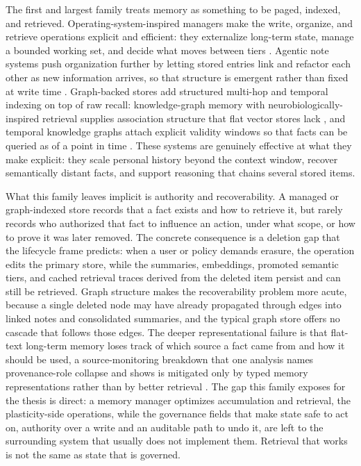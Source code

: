 The first and largest family treats memory as something to be paged, indexed, and retrieved. Operating-system-inspired managers make the write, organize, and retrieve operations explicit and efficient: they externalize long-term state, manage a bounded working set, and decide what moves between tiers \citep{packer2024memgptllmsoperatingsystems,kang2025memoryosaiagent}. Agentic note systems push organization further by letting stored entries link and refactor each other as new information arrives, so that structure is emergent rather than fixed at write time \citep{xu2025amemagenticmemoryllm}. Graph-backed stores add structured multi-hop and temporal indexing on top of raw recall: knowledge-graph memory with neurobiologically-inspired retrieval supplies association structure that flat vector stores lack \citep{gutierrez2024hipporag}, and temporal knowledge graphs attach explicit validity windows so that facts can be queried as of a point in time \citep{rasmussen2025zep}. These systems are genuinely effective at what they make explicit: they scale personal history beyond the context window, recover semantically distant facts, and support reasoning that chains several stored items.

What this family leaves implicit is authority and recoverability. A managed or graph-indexed store records that a fact exists and how to retrieve it, but rarely records who authorized that fact to influence an action, under what scope, or how to prove it was later removed. The concrete consequence is a deletion gap that the lifecycle frame predicts: when a user or policy demands erasure, the operation edits the primary store, while the summaries, embeddings, promoted semantic tiers, and cached retrieval traces derived from the deleted item persist and can still be retrieved. Graph structure makes the recoverability problem more acute, because a single deleted node may have already propagated through edges into linked notes and consolidated summaries, and the typical graph store offers no cascade that follows those edges. The deeper representational failure is that flat-text long-term memory loses track of which source a fact came from and how it should be used, a source-monitoring breakdown that one analysis names provenance-role collapse and shows is mitigated only by typed memory representations rather than by better retrieval \citep{jin2026provenancerolecollapse}. The gap this family exposes for the thesis is direct: a memory manager optimizes accumulation and retrieval, the plasticity-side operations, while the governance fields that make state safe to act on, authority over a write and an auditable path to undo it, are left to the surrounding system that usually does not implement them. Retrieval that works is not the same as state that is governed.

